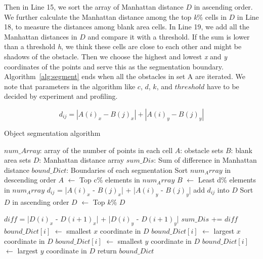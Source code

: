 Then in Line 15, we sort the array of Manhattan distance $D$ in ascending order.
We further calculate the Manhattan distance among the top \emph{k}\% cells in $D$ in Line 18, to measure the distances among blank area cells. 
In Line 19, we add all the Manhattan distances in $D$ and compare it with a threshold.
If the sum is lower than a threshold \emph{h}, we think these cells are close to each other and might be shadows of the obstacle.
Then we choose the highest and lowest \emph{x} and \emph{y} coordinates of the points and serve this as the segmentation boundary.
Algorithm~\ref{alg:segment} ends when all the obstacles in set A are iterated.
We note that parameters in the algorithm like $c$, $d$, $k$, and $threshold$ have to be decided by experiment and profiling.

\begin{equation}
    \label{eq:Manhattan}
    d_{ij} = |A(i)_x - B(j)_x| + |A(i)_y - B(j)_y|
\end{equation}

\begin{algorithm}[h]
    \caption{Object segmentation algorithm}\label{alg:segment}
    \begin{algorithmic}[1]
    \State $num\_Array$: array of the number of points in each cell
    \State $A$: obstacle sets
    \State $B$: blank area sets
    \State $D$: Manhattan distance array
    \State $sum\_Dis$: Sum of difference in Manhattan distance
    \State $bound\_Dict$: Boundaries of each segmentation
    \State Sort $num_Array$ in descending order
    \State $A$ $\gets$ Top c\% elements in $num_Array$
    \State $B$ $\gets$ Least d\% elements in $num_Array$
            \State $d_{ij}$ = |$A(i)_x$ - $B(j)_x$| + |$A(i)_y$ - $B(j)_y$|
            \State add $d_{ij}$ into $D$
        \EndWhile
        \State Sort $D$ in ascending order
        \State $D$ $\gets$ Top $k$\% $D$

            \State $diff$ = |$D(i)_x$ - $D(i+1)_x$| + |$D(i)_y$ - $D(i+1)_y$| 
            \State $sum\_Dis$ += $diff$
        \EndWhile
            \State $bound\_Dict[i]$ $\gets$ smallest $x$ coordinate in $D$
            \State $bound\_Dict[i]$ $\gets$ largest $x$ coordinate in $D$
            \State $bound\_Dict[i]$ $\gets$ smallest $y$ coordinate in $D$
            \State $bound\_Dict[i]$ $\gets$ largest $y$ coordinate in $D$
        \EndIf
    \EndWhile
    \State return $bound\_Dict$
    \end{algorithmic}
    \end{algorithm}

